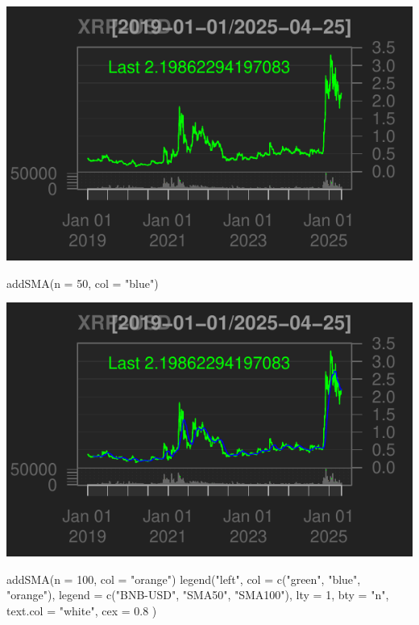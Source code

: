 \documentclass[]{tufte-handout}
\newenvironment{Shaded}{}{}
\newcommand{\AttributeTok}[1]{\textcolor[rgb]{0.49,0.56,0.16}{#1}}
\newcommand{\DecValTok}[1]{\textcolor[rgb]{0.25,0.63,0.44}{#1}}
\newcommand{\FloatTok}[1]{\textcolor[rgb]{0.25,0.63,0.44}{#1}}
\newcommand{\FunctionTok}[1]{\textcolor[rgb]{0.02,0.16,0.49}{#1}}
\newcommand{\NormalTok}[1]{#1}
\newcommand{\StringTok}[1]{\textcolor[rgb]{0.25,0.44,0.63}{#1}}
\begin{document}
\includegraphics{cripto_update_files/figure-latex/unnamed-chunk-9-1}

\begin{Shaded}
\begin{Highlighting}[]
\FunctionTok{addSMA}\NormalTok{(}\AttributeTok{n =} \DecValTok{50}\NormalTok{, }\AttributeTok{col =} \StringTok{"blue"}\NormalTok{)}
\end{Highlighting}
\end{Shaded}

\includegraphics{cripto_update_files/figure-latex/unnamed-chunk-9-2}

\begin{Shaded}
\begin{Highlighting}[]
\FunctionTok{addSMA}\NormalTok{(}\AttributeTok{n =} \DecValTok{100}\NormalTok{, }\AttributeTok{col =} \StringTok{"orange"}\NormalTok{)}
\FunctionTok{legend}\NormalTok{(}\StringTok{"left"}\NormalTok{,}
  \AttributeTok{col =} \FunctionTok{c}\NormalTok{(}\StringTok{"green"}\NormalTok{, }\StringTok{"blue"}\NormalTok{, }\StringTok{"orange"}\NormalTok{),}
  \AttributeTok{legend =} \FunctionTok{c}\NormalTok{(}\StringTok{"BNB{-}USD"}\NormalTok{, }\StringTok{"SMA50"}\NormalTok{, }\StringTok{"SMA100"}\NormalTok{), }\AttributeTok{lty =} \DecValTok{1}\NormalTok{, }\AttributeTok{bty =} \StringTok{"n"}\NormalTok{,}
  \AttributeTok{text.col =} \StringTok{"white"}\NormalTok{, }\AttributeTok{cex =} \FloatTok{0.8}
\NormalTok{)}
\end{Highlighting}
\end{Shaded}
\end{document}
